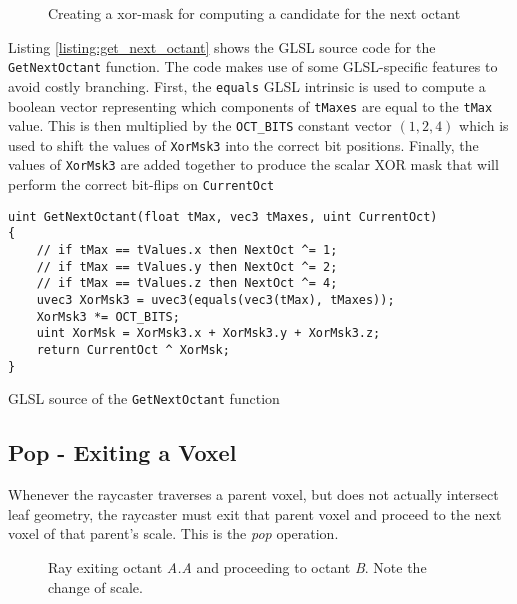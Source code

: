 \begin{figure}[ht]
    \centering
    \footnotesize
    
    \caption{Creating a xor-mask for computing a candidate for the next octant}
    \label{fig:get_next_oct}
\end{figure}


Listing \ref{listing:get_next_octant} shows the GLSL source code for the \texttt{GetNextOctant} function. The code makes use of some GLSL-specific features to avoid costly branching. First, the \texttt{equals} GLSL intrinsic is used to compute a boolean vector representing which components of \texttt{tMaxes} are equal to the \texttt{tMax} value. This is then multiplied by the \texttt{OCT\_BITS} constant vector $(1, 2, 4)$ which is used to shift the values of \texttt{XorMsk3} into the correct bit positions. Finally, the values of \texttt{XorMsk3} are added together to produce the scalar XOR mask that will perform the correct bit-flips on \texttt{CurrentOct}

\begin{listing}[ht]
\begin{verbatim}
uint GetNextOctant(float tMax, vec3 tMaxes, uint CurrentOct)
{
    // if tMax == tValues.x then NextOct ^= 1;
    // if tMax == tValues.y then NextOct ^= 2;
    // if tMax == tValues.z then NextOct ^= 4;
    uvec3 XorMsk3 = uvec3(equals(vec3(tMax), tMaxes));
    XorMsk3 *= OCT_BITS;
    uint XorMsk = XorMsk3.x + XorMsk3.y + XorMsk3.z;
    return CurrentOct ^ XorMsk;
}
\end{verbatim}
\caption{GLSL source of the \texttt{GetNextOctant} function}
\label{listing:get_next_octant}
\end{listing}


\clearpage


\label{sec:pop}
\subsection{Pop - Exiting a Voxel}
Whenever the raycaster traverses a parent voxel, but does not actually intersect leaf geometry, the raycaster must exit that parent voxel and proceed to the next voxel of that parent's scale. This is the \textit{pop} operation.

\begin{figure}[ht]
\footnotesize
    \centering
    
    \caption{Ray exiting octant \textit{A.A} and proceeding to octant \textit{B}. Note the change of scale.}
    \label{fig:pop_example}
\end{figure}

